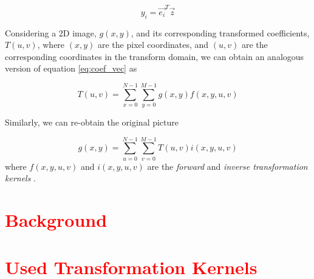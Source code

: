 \begin{equation} \label{eq:coef_vec}
    y_i = \vec{e_i}^T \vec{z}
\end{equation}

Considering a 2D image, $g(x,y)$, and its corresponding transformed coefficients, $T(u,v)$, where $(x,y)$ are the pixel coordinates, and $(u,v)$ are the corresponding coordinates in the transform domain, we can obtain an analogous version of equation \ref{eq:coef_vec} as

\begin{equation}
    T(u,v) = \sum_{x=0}^{N-1}\sum_{y=0}^{M-1}g(x,y)f(x,y,u,v)
\end{equation}

Similarly, we can re-obtain the original picture

\begin{equation}
    g(x,y) = \sum_{u=0}^{N-1}\sum_{v=0}^{M-1}T(u,v)i(x,y,u,v)
\end{equation}
where $f(x,y,u,v)$ and $i(x,y,u,v)$ are the \emph{forward} and \emph{inverse transformation kernels} \cite[ch. 4]{shiImageVideoCompression2008}.


\section{\textcolor{red}{Background}}

\section{\textcolor{red}{Used Transformation Kernels}}

\printbibliography[heading=subbibliography]
